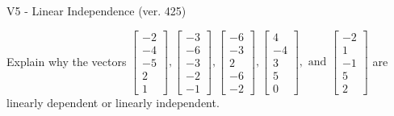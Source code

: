 \begin{exercise}
  \begin{exerciseTitle}V5 - Linear Independence (ver. 425)\end{exerciseTitle}
  \begin{exerciseStatement}
    Explain why the vectors \(\left[\begin{array}{r}
-2 \\
-4 \\
-5 \\
2 \\
1
\end{array}\right] , \left[\begin{array}{r}
-3 \\
-6 \\
-3 \\
-2 \\
-1
\end{array}\right] , \left[\begin{array}{r}
-6 \\
-3 \\
2 \\
-6 \\
-2
\end{array}\right] , \left[\begin{array}{r}
4 \\
-4 \\
3 \\
5 \\
0
\end{array}\right] , \text{ and } \left[\begin{array}{r}
-2 \\
1 \\
-1 \\
5 \\
2
\end{array}\right]\) are linearly dependent or linearly independent.	



\end{exerciseStatement}
\end{exercise}
